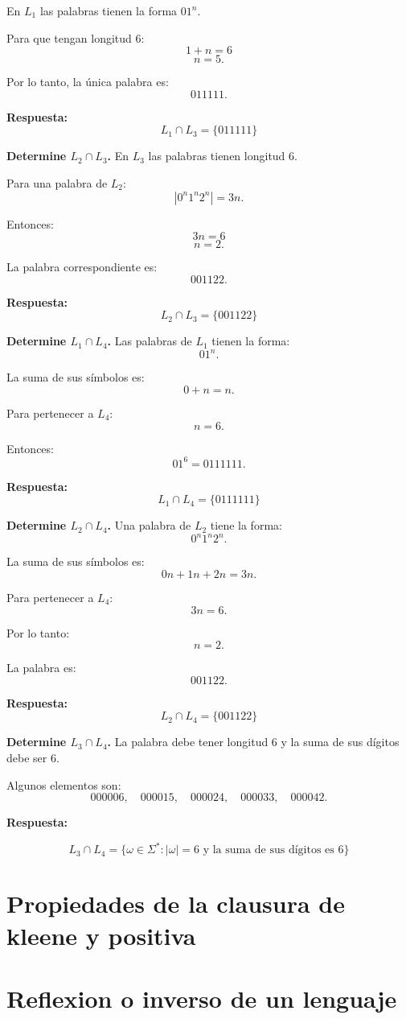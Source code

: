 \documentclass[12pt]{article}
\begin{document}
En $L_1$ las palabras tienen la forma $01^n$.

Para que tengan longitud $6$:
\[
1+n=6
\]
\[
n=5.
\]

Por lo tanto, la única palabra es:
\[
011111.
\]

\textbf{Respuesta:}
\[
\boxed{L_1\cap L_3=\{011111\}}
\]

\textbf{Determine $L_2\cap L_3$.}
En $L_3$ las palabras tienen longitud $6$.

Para una palabra de $L_2$:
\[
|0^n1^n2^n|=3n.
\]

Entonces:
\[
3n=6
\]
\[
n=2.
\]

La palabra correspondiente es:
\[
001122.
\]

\textbf{Respuesta:}
\[
\boxed{L_2\cap L_3=\{001122\}}
\]

\textbf{Determine $L_1\cap L_4$.}
Las palabras de $L_1$ tienen la forma:
\[
01^n.
\]

La suma de sus símbolos es:
\[
0+n=n.
\]

Para pertenecer a $L_4$:
\[
n=6.
\]

Entonces:
\[
01^6=0111111.
\]

\textbf{Respuesta:}
\[
\boxed{L_1\cap L_4=\{0111111\}}
\]

\textbf{Determine $L_2\cap L_4$.}
Una palabra de $L_2$ tiene la forma:
\[
0^n1^n2^n.
\]

La suma de sus símbolos es:
\[
0n+1n+2n=3n.
\]

Para pertenecer a $L_4$:
\[
3n=6.
\]

Por lo tanto:
\[
n=2.
\]

La palabra es:
\[
001122.
\]

\textbf{Respuesta:}
\[
\boxed{L_2\cap L_4=\{001122\}}
\]

\textbf{Determine $L_3\cap L_4$.}
La palabra debe tener longitud $6$ y la suma de sus dígitos debe ser $6$.

Algunos elementos son:
\[
000006,\quad
000015,\quad
000024,\quad
000033,\quad
000042.
\]

\textbf{Respuesta:}

\[
\boxed{
L_3\cap L_4=
\{\omega\in\Sigma^*:|\omega|=6
\text{ y la suma de sus dígitos es }6\}
}
\]

\section{Propiedades de la clausura de kleene y positiva}

\section{Reflexion o inverso de un lenguaje}
\end{document}
